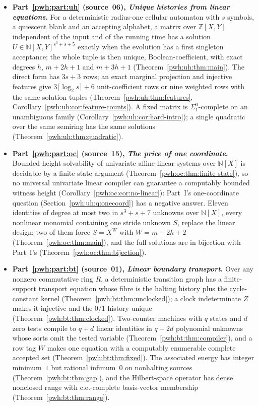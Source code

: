 \documentclass[11pt,letterpaper]{article}
\numberwithin{equation}{section}
\theoremstyle{definition}
\newcommand{\N}{\mathbb N}
\newcommand{\Z}{\mathbb Z}
\begin{document}
\begin{itemize}
\item \textbf{Part~\ref{pwh:part:uh} (source~06), \emph{Unique histories
from linear equations}.} For a deterministic radius-one cellular automaton
with $s$ symbols, a quiescent blank and an accepting alphabet, a matrix
over $\Z[X,Y]$ independent of the input and of the running time has a
solution $U\in\N[X,Y]^{s^3+s+5}$ exactly when the evolution has a first
singleton acceptance; the whole tuple is then unique, Boolean-coefficient,
with exact degrees $h$, $m+2h+1$ and $m+3h+1$
(Theorem~\ref{pwh:uh:thm:main}). The direct form has $3s+3$ rows; an
exact marginal projection and injective features give
$3\lceil\log_2s\rceil+6$ unit-coefficient rows or nine weighted rows with
the same solution tuples (Theorem~\ref{pwh:uh:thm:features},
Corollary~\ref{pwh:uh:cor:feature-counts}). A fixed matrix is
$\Sigma^0_1$-complete on an unambiguous family
(Corollary~\ref{pwh:uh:cor:hard-intro}); a single quadratic over the same
semiring has the same solutions (Theorem~\ref{pwh:uh:thm:quadratic}).
\item \textbf{Part~\ref{pwh:part:oc} (source~15), \emph{The price of one
coordinate}.} Bounded-height solvability of univariate affine-linear
systems over $\N[X]$ is decidable by a finite-state argument
(Theorem~\ref{pwh:oc:thm:finite-state}), so no universal univariate
linear compiler can guarantee a computably bounded witness height
(Corollary~\ref{pwh:oc:cor:no-linear}): Part~I's one-coordinate question
(Section~\ref{pwh:uh:q:onecoord}) has a negative answer. Eleven identities
of degree at most two in $s^3+s+7$ unknowns over $\N[X]$, every nonlinear
monomial containing one stride unknown $S$, replace the linear design; two
of them force $S=X^W$ with $W=m+2h+2$ (Theorem~\ref{pwh:oc:thm:main}), and
the full solutions are in bijection with Part~I's
(Theorem~\ref{pwh:oc:thm:bijection}).
\item \textbf{Part~\ref{pwh:part:bt} (source~01), \emph{Linear boundary
transport}.} Over any nonzero commutative ring $R$, a deterministic
transition graph has a finite-support transport equation whose fibre is the
halting history plus the cycle-constant kernel
(Theorem~\ref{pwh:bt:thm:unclocked}); a clock indeterminate $Z$ makes it
injective and the $0/1$ history unique (Theorem~\ref{pwh:bt:thm:clocked}).
Two-counter machines with $q$ states and $d$ zero tests compile to $q+d$
linear identities in $q+2d$ polynomial unknowns whose sorts omit the tested
variable (Theorem~\ref{pwh:bt:thm:compiler}), and a row tag $W$ makes one
equation with a computably enumerable complete accepted set
(Theorem~\ref{pwh:bt:thm:fixed}). The associated energy has integer
minimum~$1$ but rational infimum~$0$ on nonhalting sources
(Theorem~\ref{pwh:bt:thm:gap}), and the Hilbert-space operator has dense
nonclosed range with c.e.-complete basis-vector membership
(Theorem~\ref{pwh:bt:thm:range}).
\end{itemize}
\end{document}
